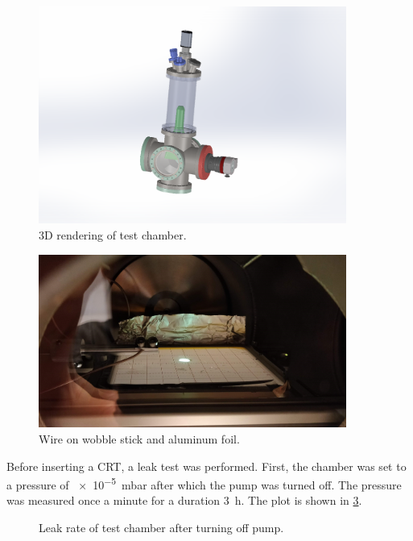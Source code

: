 \begin{figure}[ht]
	\centering
	
	\includegraphics[width=0.9\textwidth]{./Chapters/vacuum-chamber/test_chamber} %
	
	\caption{3D rendering of test chamber.}
	\label{fig:3D rendering of test chamber}
\end{figure}


\begin{figure}[ht]
	\centering
	
	\includegraphics[width=0.9\textwidth]{./Chapters/vacuum-chamber/center_image}
	
	\caption{Wire on wobble stick and aluminum foil.}
	\label{fig:Wire on wobble stick and aluminum foil}
\end{figure}

Before inserting a CRT, a leak test was performed. First, the chamber was set to a pressure of \SI{e-5}{\milli\bar} after which the pump was turned off. The pressure was measured once a minute for a duration \SI{3}{\hour}. The plot is shown in \cref{fig:Leak rate of test chamber after turning off pump}.

\begin{figure}[ht]
	\centering
		
	\begin{tikzpicture}
		
	\end{tikzpicture}
	
	\caption{Leak rate of test chamber after turning off pump.}
	\label{fig:Leak rate of test chamber after turning off pump}
\end{figure}


